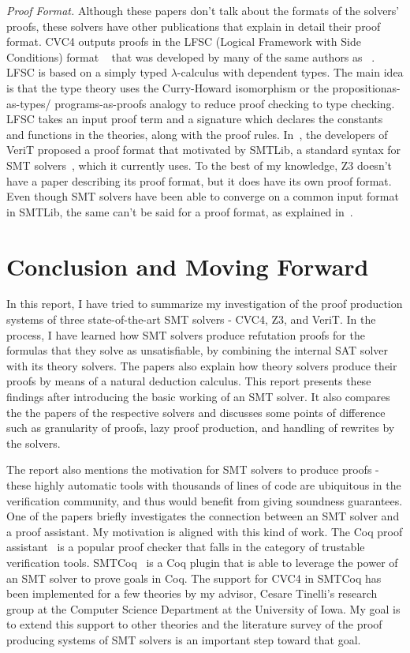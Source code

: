 \documentclass{article}
\begin{document}
\textit{Proof Format.} Although these papers don't 
talk about the formats of the solvers' proofs, these solvers
have other publications that explain in detail their 
proof format. CVC4 outputs proofs in the LFSC 
(Logical Framework with Side Conditions) format 
~\cite{DBLP:journals/fmsd/StumpORHT13} that 
was developed by many of the same authors as 
~\cite{DBLP:conf/fmcad/KatzBTRH16}. LFSC is based on 
a simply typed $\lambda$-calculus with dependent types. 
The main idea is that the type theory uses the 
Curry-Howard isomorphism or the propositionas-as-types/
programs-as-proofs analogy to reduce 
proof checking to type checking. LFSC takes an 
input proof term and a signature which declares the 
constants and functions in the theories, along 
with the proof rules. In~\cite{Besson2011AFP}, the 
developers of VeriT proposed a proof format that 
motivated by SMTLib, a standard syntax for 
SMT solvers~\cite{BarFT-SMTLIB}, which it 
currently uses. To the best of my knowledge, Z3 
doesn't have a paper describing its proof format, 
but it does have its own proof format. Even though 
SMT solvers have been able to converge on a common 
input format in SMTLib, the same can't be said for 
a proof format, as explained in~\cite{Fontaine2014ProofsIS}.


\section{Conclusion and Moving Forward}
\label{sec:conc}
In this report, I have tried to summarize my investigation
of the proof production systems of three state-of-the-art 
SMT solvers - CVC4, Z3, and VeriT. In the process,
I have learned how SMT solvers produce refutation 
proofs for the formulas that they solve as unsatisfiable, 
by combining the internal SAT solver with its theory
solvers. The papers also explain how theory solvers 
produce their proofs by means of a natural deduction
calculus. This report presents these findings after 
introducing the basic working of an SMT solver. 
It also compares the the papers of the respective 
solvers and discusses some points of difference 
such as granularity of proofs, lazy proof production, 
and handling of rewrites by the solvers.

The report also mentions the motivation for SMT 
solvers to produce proofs - these highly automatic 
tools with thousands of lines of code are ubiquitous 
in the verification community, and thus would 
benefit from giving soundness guarantees. One of 
the papers briefly investigates the connection between 
an SMT solver and a proof assistant. My motivation 
is aligned with this kind of work. The Coq proof 
assistant~\cite{coq} is a popular proof checker 
that falls in the category of trustable verification 
tools. SMTCoq~\cite{DBLP:conf/cav/EkiciMTKKRB17} is a 
Coq plugin that is able to leverage the power of an 
SMT solver to prove goals in Coq. The support 
for CVC4 in SMTCoq has been implemented for a 
few theories by my advisor, Cesare Tinelli's 
research group at the Computer Science Department 
at the University of Iowa. My goal is to extend 
this support to other theories and the literature 
survey of the proof producing systems of SMT solvers
is an important step toward that goal.



\end{document}
